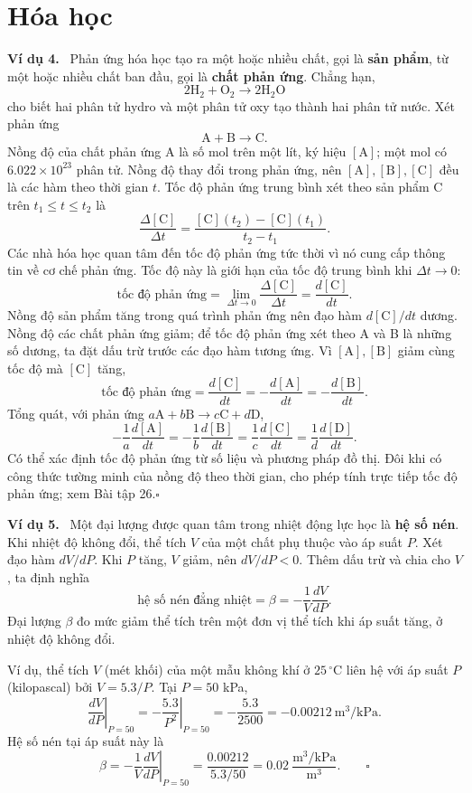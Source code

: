 \documentclass[12pt,a4paper]{article}
\newcommand{\ex}[1]{\par\medskip\noindent\textbf{Ví dụ #1.}\ }
\begin{document}
\section*{Hóa học}
\ex{4} Phản ứng hóa học tạo ra một hoặc nhiều chất, gọi là \textbf{sản phẩm}, từ một hoặc nhiều chất ban đầu, gọi là \textbf{chất phản ứng}. Chẳng hạn,
\[2\mathrm H_2+\mathrm O_2\longrightarrow2\mathrm H_2\mathrm O\]
cho biết hai phân tử hydro và một phân tử oxy tạo thành hai phân tử nước. Xét phản ứng
\[\mathrm A+\mathrm B\longrightarrow\mathrm C.\]
Nồng độ của chất phản ứng A là số mol trên một lít, ký hiệu $[\mathrm A]$; một mol có $6.022\times10^{23}$ phân tử. Nồng độ thay đổi trong phản ứng, nên $[\mathrm A],[\mathrm B],[\mathrm C]$ đều là các hàm theo thời gian $t$. Tốc độ phản ứng trung bình xét theo sản phẩm C trên $t_1\le t\le t_2$ là
\[\frac{\Delta[\mathrm C]}{\Delta t}=\frac{[\mathrm C](t_2)-[\mathrm C](t_1)}{t_2-t_1}.\]
Các nhà hóa học quan tâm đến tốc độ phản ứng tức thời vì nó cung cấp thông tin về cơ chế phản ứng. Tốc độ này là giới hạn của tốc độ trung bình khi $\Delta t\to0$:
\[\text{tốc độ phản ứng}=\lim_{\Delta t\to0}\frac{\Delta[\mathrm C]}{\Delta t}=\frac{d[\mathrm C]}{dt}.\]
Nồng độ sản phẩm tăng trong quá trình phản ứng nên đạo hàm $d[\mathrm C]/dt$ dương. Nồng độ các chất phản ứng giảm; để tốc độ phản ứng xét theo A và B là những số dương, ta đặt dấu trừ trước các đạo hàm tương ứng. Vì $[\mathrm A],[\mathrm B]$ giảm cùng tốc độ mà $[\mathrm C]$ tăng,
\[\text{tốc độ phản ứng}=\frac{d[\mathrm C]}{dt}=-\frac{d[\mathrm A]}{dt}=-\frac{d[\mathrm B]}{dt}.\]
Tổng quát, với phản ứng $a\mathrm A+b\mathrm B\longrightarrow c\mathrm C+d\mathrm D$,
\[-\frac1a\frac{d[\mathrm A]}{dt}=-\frac1b\frac{d[\mathrm B]}{dt}
=\frac1c\frac{d[\mathrm C]}{dt}=\frac1d\frac{d[\mathrm D]}{dt}.\]
Có thể xác định tốc độ phản ứng từ số liệu và phương pháp đồ thị. Đôi khi có công thức tường minh của nồng độ theo thời gian, cho phép tính trực tiếp tốc độ phản ứng; xem Bài tập 26.\hfill$\square$
\ex{5} Một đại lượng được quan tâm trong nhiệt động lực học là \textbf{hệ số nén}. Khi nhiệt độ không đổi, thể tích $V$ của một chất phụ thuộc vào áp suất $P$. Xét đạo hàm $dV/dP$. Khi $P$ tăng, $V$ giảm, nên $dV/dP<0$. Thêm dấu trừ và chia cho $V$, ta định nghĩa
\[\text{hệ số nén đẳng nhiệt}=\beta=-\frac1V\frac{dV}{dP}.\]
Đại lượng $\beta$ đo mức giảm thể tích trên một đơn vị thể tích khi áp suất tăng, ở nhiệt độ không đổi.

Ví dụ, thể tích $V$ (mét khối) của một mẫu không khí ở $25\,^{\circ}\mathrm C$ liên hệ với áp suất $P$ (kilopascal) bởi $V=5.3/P$. Tại $P=50$ kPa,
\[\left.\frac{dV}{dP}\right|_{P=50}
=\left.-\frac{5.3}{P^2}\right|_{P=50}
=-\frac{5.3}{2500}=-0.00212\ \mathrm{m^3/kPa}.\]
Hệ số nén tại áp suất này là
\[\beta=-\left.\frac1V\frac{dV}{dP}\right|_{P=50}
=\frac{0.00212}{5.3/50}=0.02\ \frac{\mathrm{m^3/kPa}}{\mathrm{m^3}}.\qquad\square\]
\end{document}
